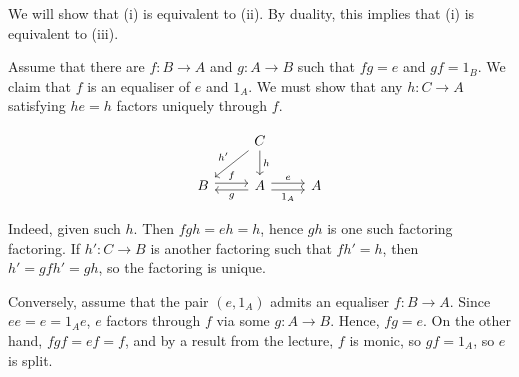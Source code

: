 We will show that (i) is equivalent to (ii). By duality, this implies that (i)
is equivalent to (iii).

Assume that there are $f\colon B\to A$ and $g\colon A\to B$ such that $fg = e$
and $gf = 1_B$. We claim that $f$ is an equaliser of $e$ and $1_A$.
We must show that any $h\colon C\to A$ satisfying $he = h$
factors uniquely through $f$.

\[\begin{tikzcd}
	& C\ar[dl, "h'" above left]\ar[d, "h"]\\
	B\ar[r, shift left, "f"] & A\ar[l, shift left, "g"]\ar[r, shift left, "e"]\ar[r, shift right, "1_A" below] & A
\end{tikzcd}\]

Indeed, given such $h$. Then $fgh = eh = h$, hence
$gh$ is one such factoring factoring. If $h'\colon C\to B$ is another factoring such that
$fh' = h$, then $h' = gfh' = gh$, so the factoring is unique.

Conversely, assume that the pair $(e, 1_A)$ admits an equaliser $f\colon B\to A$.
Since $ee = e = 1_Ae$, $e$ factors through $f$ via some $g\colon A\to B$. Hence,
$fg = e$. On the other hand, $fgf = ef = f$, and by a result from the lecture,
$f$ is monic, so $gf = 1_A$, so $e$ is split.
